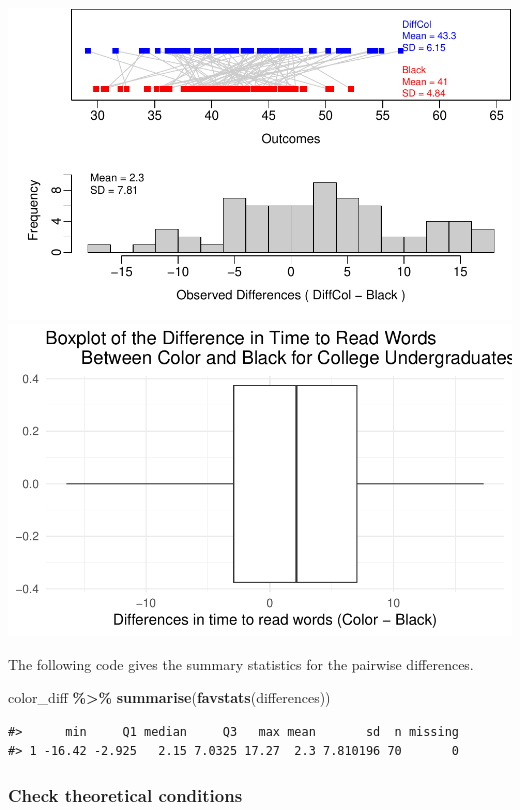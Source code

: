 \documentclass[
]{report}
\newenvironment{Shaded}{\begin{snugshade}}{\end{snugshade}}
\newcommand{\FunctionTok}[1]{\textcolor[rgb]{0.13,0.29,0.53}{\textbf{#1}}}
\newcommand{\NormalTok}[1]{#1}
\newcommand{\SpecialCharTok}[1]{\textcolor[rgb]{0.81,0.36,0.00}{\textbf{#1}}}
\begin{document}
\begin{center}\includegraphics[width=0.7\linewidth]{11-A23-paired-theory_files/figure-latex/unnamed-chunk-1-1} \includegraphics[width=0.7\linewidth]{11-A23-paired-theory_files/figure-latex/unnamed-chunk-1-2} \end{center}

The following code gives the summary statistics for the pairwise differences.

\begin{Shaded}
\begin{Highlighting}[]
\NormalTok{color\_diff }\SpecialCharTok{\%\textgreater{}\%} 
  \FunctionTok{summarise}\NormalTok{(}\FunctionTok{favstats}\NormalTok{(differences))}
\end{Highlighting}
\end{Shaded}

\begin{verbatim}
#>      min     Q1 median     Q3   max mean       sd  n missing
#> 1 -16.42 -2.925   2.15 7.0325 17.27  2.3 7.810196 70       0
\end{verbatim}

\subsubsection*{Check theoretical conditions}\label{check-theoretical-conditions-1}
\end{document}
